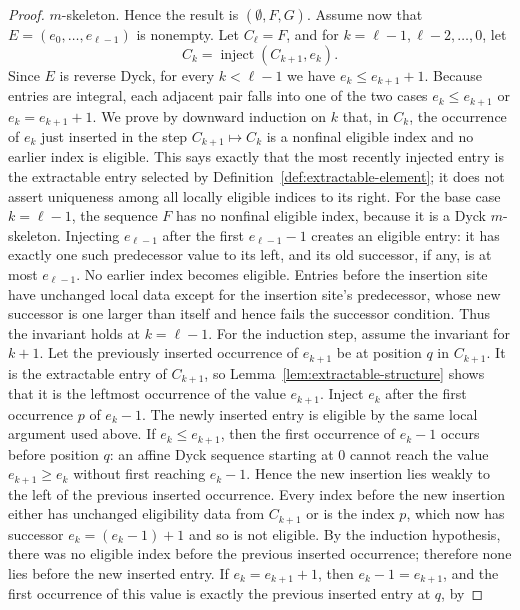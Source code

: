 \documentclass[11pt]{article}
\theoremstyle{plain}
\theoremstyle{definition}
\theoremstyle{remark}
\begin{document}
\begin{proof}
\(m\)-skeleton.  Hence the result is \((\emptyset,F,G)\).
Assume now that \(E=(e_0,\ldots,e_{\ell-1})\) is nonempty.  Let
\(C_\ell=F\), and for \(k=\ell-1,\ell-2,\ldots,0\), let
\[
  C_k=\operatorname{inject}(C_{k+1},e_k).
\]
Since \(E\) is reverse Dyck, for every \(k<\ell-1\) we have
\(e_k\le e_{k+1}+1\).  Because entries are integral, each adjacent pair falls
into one of the two cases \(e_k\le e_{k+1}\) or \(e_k=e_{k+1}+1\).
We prove by downward induction on \(k\) that, in \(C_k\), the occurrence of
\(e_k\) just inserted in the step \(C_{k+1}\mapsto C_k\) is a nonfinal eligible
index and no earlier index is eligible.  This says exactly that the most
recently injected entry is the extractable entry selected by
Definition~\ref{def:extractable-element}; it does not assert uniqueness among
all locally eligible indices to its right.
For the base case \(k=\ell-1\), the sequence \(F\) has no nonfinal eligible
index, because it is a Dyck \(m\)-skeleton.  Injecting \(e_{\ell-1}\) after the
first \(e_{\ell-1}-1\) creates an eligible entry: it has exactly one such
predecessor value to its left, and its old successor, if any, is at most
\(e_{\ell-1}\).  No earlier index becomes eligible.  Entries before the
insertion site have unchanged local data except for the insertion site's
predecessor, whose new successor is one larger than itself and hence fails the
successor condition.  Thus the invariant holds at \(k=\ell-1\).
For the induction step, assume the invariant for \(k+1\).  Let the previously
inserted occurrence of \(e_{k+1}\) be at position \(q\) in \(C_{k+1}\).  It is
the extractable entry of \(C_{k+1}\), so Lemma~\ref{lem:extractable-structure}
shows that it is the leftmost occurrence of the value \(e_{k+1}\).  Inject
\(e_k\) after the first occurrence \(p\) of \(e_k-1\).  The newly inserted
entry is eligible by the same local argument used above.
If \(e_k\le e_{k+1}\), then the first occurrence of \(e_k-1\) occurs before
position \(q\): an affine Dyck sequence starting at \(0\) cannot reach the
value \(e_{k+1}\ge e_k\) without first reaching \(e_k-1\).  Hence the new
insertion lies weakly to the left of the previous inserted occurrence.  Every
index before the new insertion either has unchanged eligibility data from
\(C_{k+1}\) or is the index \(p\), which now has successor \(e_k=(e_k-1)+1\)
and so is not eligible.  By the induction hypothesis, there was no eligible
index before the previous inserted occurrence; therefore none lies before the
new inserted entry.
If \(e_k=e_{k+1}+1\), then \(e_k-1=e_{k+1}\), and the first occurrence of this
value is exactly the previous inserted entry at \(q\), by

\end{proof}
\end{document}
